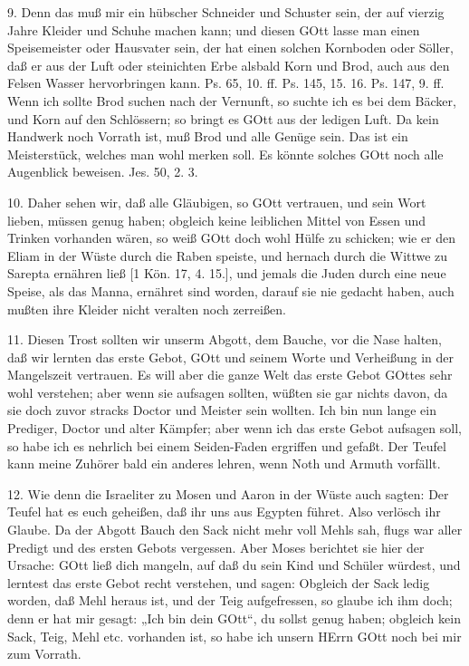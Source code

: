 9. Denn das muß mir ein hübscher Schneider und Schuster sein, der auf vierzig Jahre Kleider und Schuhe machen kann; und diesen GOtt lasse man einen Speisemeister oder Hausvater sein, der hat einen solchen Kornboden oder Söller, daß er aus der Luft oder steinichten Erbe alsbald Korn und Brod, auch aus den Felsen Wasser hervorbringen kann. Ps. 65, 10. ff. Ps. 145, 15. 16. Ps. 147, 9. ff. Wenn ich sollte Brod suchen nach der Vernunft, so suchte ich es bei dem Bäcker, und Korn auf den Schlössern; so bringt es GOtt aus der ledigen Luft. Da kein Handwerk noch Vorrath ist, muß Brod und alle Genüge sein. Das ist ein Meisterstück, welches man wohl merken soll. Es könnte solches GOtt noch alle Augenblick beweisen. Jes. 50, 2. 3.

10. Daher sehen wir, daß alle Gläubigen, so GOtt vertrauen, und sein Wort lieben, müssen genug haben; obgleich keine leiblichen Mittel von Essen und Trinken vorhanden wären, so weiß GOtt doch wohl Hülfe zu schicken; wie er den Eliam in der Wüste durch die Raben speiste, und hernach durch die Wittwe zu Sarepta ernähren ließ [1 Kön. 17, 4. 15.], und jemals die Juden durch eine neue Speise, als das Manna, ernähret sind worden, darauf sie nie gedacht haben, auch mußten ihre Kleider nicht veralten noch zerreißen.

11. Diesen Trost sollten wir unserm Abgott, dem Bauche, vor die Nase halten, daß wir lernten das erste Gebot, GOtt und seinem Worte und Verheißung in der Mangelszeit vertrauen. Es will aber die ganze Welt das erste Gebot GOttes sehr wohl verstehen; aber wenn sie aufsagen sollten, wüßten sie gar nichts davon, da sie doch zuvor stracks Doctor und Meister sein wollten. Ich bin nun lange ein Prediger, Doctor und alter Kämpfer; aber wenn ich das erste Gebot aufsagen soll, so habe ich es nehrlich bei einem Seiden-Faden ergriffen und gefaßt. Der Teufel kann meine Zuhörer bald ein anderes lehren, wenn Noth und Armuth vorfällt.

12. Wie denn die Israeliter zu Mosen und Aaron in der Wüste auch sagten: Der Teufel hat es euch geheißen, daß ihr uns aus Egypten führet. Also verlösch ihr Glaube. Da der Abgott Bauch den Sack nicht mehr voll Mehls sah, flugs war aller Predigt und des ersten Gebots vergessen. Aber Moses berichtet sie hier der Ursache: GOtt ließ dich mangeln, auf daß du sein Kind und Schüler würdest, und lerntest das erste Gebot recht verstehen, und sagen: Obgleich der Sack ledig worden, daß Mehl heraus ist, und der Teig aufgefressen, so glaube ich ihm doch; denn er hat mir gesagt: „Ich bin dein GOtt“, du sollst genug haben; obgleich kein
Sack, Teig, Mehl etc. vorhanden ist, so habe ich unsern HErrn GOtt noch bei mir zum Vorrath.

